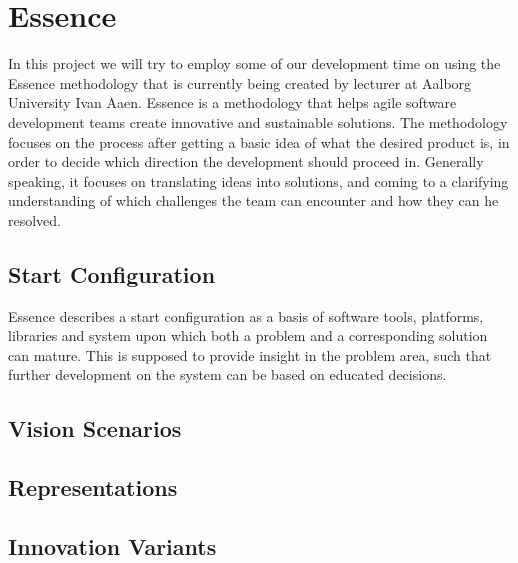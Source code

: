 
\section{Essence}
\label{sec:essence}

In this project we will try to employ some of our development time on using the Essence methodology that is currently being created by lecturer at Aalborg University Ivan Aaen. Essence is a methodology that helps agile software development teams create innovative and sustainable solutions. The methodology focuses on the process after getting a basic idea of what the desired product is, in order to decide which direction the development should proceed in. Generally speaking, it focuses on translating ideas into solutions, and coming to a clarifying understanding of which challenges the team can encounter and how they can he resolved.  

\subsection{Start Configuration}
\label{sub:essence_start_configuration}

Essence describes a start configuration as a basis of software tools, platforms, libraries and system upon which both a problem and a corresponding solution can mature. This is supposed to provide insight in the problem area, such that further development on the system can be based on educated decisions. 

\subsection{Vision Scenarios}
\label{sub:essence_vision_scenarios}

\subsection{Representations}
\label{sub:essence_representations}

\subsection{Innovation Variants}
\label{sub:essence_innovation_variants}

 

